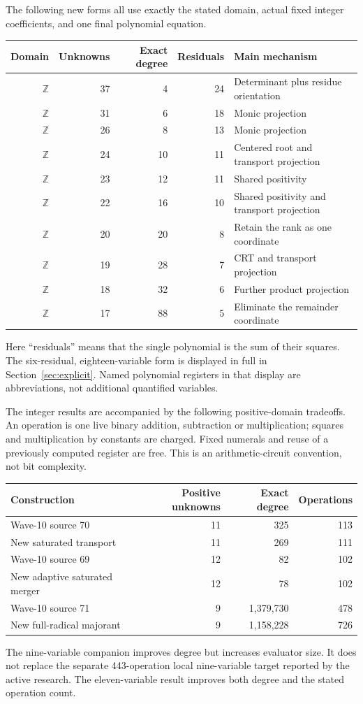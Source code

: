 \documentclass[11pt]{article}
\theoremstyle{remark}\newtheorem{remark}[theorem]{Remark}
\newcommand{\Z}{\mathbb Z}
\begin{document}
The following new forms all use exactly the stated domain, actual fixed
integer coefficients, and one final polynomial equation.
\begin{center}
\begin{tabular}{rrrrl}
\toprule
Domain & Unknowns & Exact degree & Residuals & Main mechanism\\
\midrule
$\Z$ & 37 & 4 & 24 & Determinant plus residue orientation\\
$\Z$ & 31 & 6 & 18 & Monic projection\\
$\Z$ & 26 & 8 & 13 & Monic projection\\
$\Z$ & 24 & 10 & 11 & Centered root and transport projection\\
$\Z$ & 23 & 12 & 11 & Shared positivity\\
$\Z$ & 22 & 16 & 10 & Shared positivity and transport projection\\
$\Z$ & 20 & 20 & 8 & Retain the rank as one coordinate\\
$\Z$ & 19 & 28 & 7 & CRT and transport projection\\
$\Z$ & 18 & 32 & 6 & Further product projection\\
$\Z$ & 17 & 88 & 5 & Eliminate the remainder coordinate\\
\bottomrule
\end{tabular}
\end{center}
Here ``residuals'' means that the single polynomial is the sum of their
squares. The six-residual, eighteen-variable form is displayed in full
in Section~\ref{sec:explicit}. Named polynomial registers in that display
are abbreviations, not additional quantified variables.

The integer results are accompanied by the following positive-domain
tradeoffs. An operation is one live binary addition, subtraction or
multiplication; squares and multiplication by constants are charged.
Fixed numerals and reuse of a previously computed register are free.
This is an arithmetic-circuit convention, not bit complexity.
\begin{center}
\begin{tabular}{lrrr}
\toprule
Construction & Positive unknowns & Exact degree & Operations\\
\midrule
Wave-10 source 70 & 11 & 325 & 113\\
New saturated transport & 11 & 269 & 111\\
Wave-10 source 69 & 12 & 82 & 102\\
New adaptive saturated merger & 12 & 78 & 102\\
Wave-10 source 71 & 9 & 1,379,730 & 478\\
New full-radical majorant & 9 & 1,158,228 & 726\\
\bottomrule
\end{tabular}
\end{center}
The nine-variable companion improves degree but increases evaluator size.
It does not replace the separate 443-operation local nine-variable target
reported by the active research. The eleven-variable result improves
both degree and the stated operation count.
\end{document}
